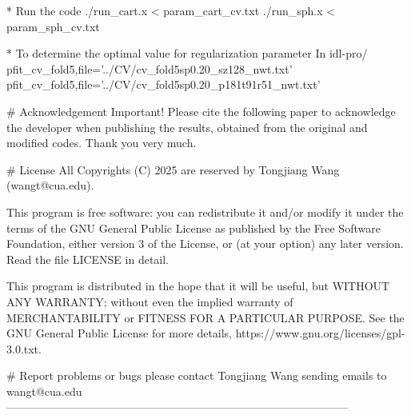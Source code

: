       * Run the code
      ./run_cart.x < param_cart_cv.txt %
      ./run_sph.x < param_sph_cv.txt   %

      * To determine the optimal value for regularization parameter 
      In idl-pro/
      pfit_cv_fold5,file='../CV/cv_fold5sp0.20_sz128_nwt.txt' %
      pfit_cv_fold5,file='../CV/cv_fold5sp0.20_p181t91r51_nwt.txt' %


   # Acknowledgement
    Important! Please cite the following paper to acknowledge the developer when  
    publishing the results, obtained from the original and modified codes. 
    Thank you very much. 


   # License
    All Copyrights (C) 2025 are reserved by Tongjiang Wang (wangt@cua.edu).

    This program is free software: you can redistribute it and/or modify
    it under the terms of the GNU General Public License as published by
    the Free Software Foundation, either version 3 of the License, or
    (at your option) any later version. Read the file LICENSE in detail. 

    This program is distributed in the hope that it will be useful,
    but WITHOUT ANY WARRANTY; without even the implied warranty of
    MERCHANTABILITY or FITNESS FOR A PARTICULAR PURPOSE.  See the
    GNU General Public License for more details, 
    https://www.gnu.org/licenses/gpl-3.0.txt.

   
   # Report problems or bugs
     please contact Tongjiang Wang sending emails to wangt@cua.edu 
--------------------------------------------------------------------------------------------
